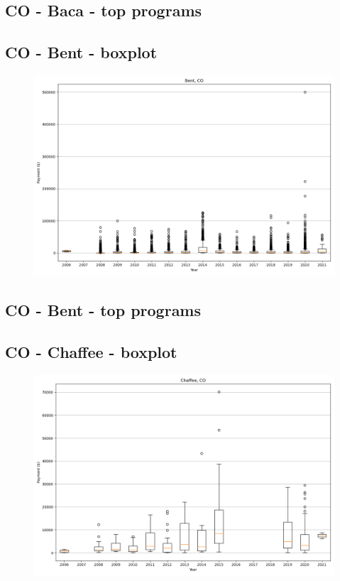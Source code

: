 \subsection*{CO - Baca - top programs}

\newpage
\subsection*{CO - Bent - boxplot}
\begin{figure}[h]
\centering
\includegraphics[width=7in]{../output/boxplots/counties/Bent-CO_boxplot.png}
\end{figure}


\subsection*{CO - Bent - top programs}

\newpage
\subsection*{CO - Chaffee - boxplot}
\begin{figure}[h]
\centering
\includegraphics[width=7in]{../output/boxplots/counties/Chaffee-CO_boxplot.png}
\end{figure}


